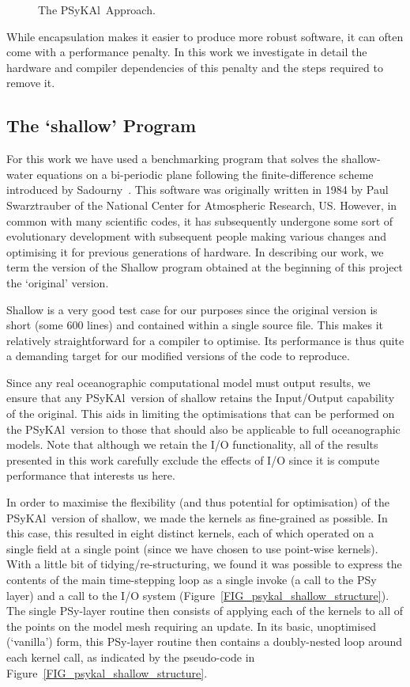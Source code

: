 \documentclass[journal]{IEEEtran}
\newcommand{\psykal}{{PS}y{KA}l\ }
\begin{document}
\begin{figure}
\centering
\caption{The \psykal Approach.}
\end{figure}

While encapsulation makes it easier to produce more robust software,
it can often come with a performance penalty. In this work we
investigate in detail the hardware and compiler dependencies of this
penalty and the steps required to remove it.

\subsection{The `shallow' Program}
For this work we have used a benchmarking program that solves the
shallow-water equations on a bi-periodic plane following the
finite-difference scheme introduced by Sadourny~\cite{sadourny75}.
This software was originally written in 1984 by Paul Swarztrauber of
the National Center for Atmospheric Research, US.  However, in common
with many scientific codes, it has subsequently undergone some sort of
evolutionary development with subsequent people making various changes
and optimising it for previous generations of hardware.  In describing
our work, we term the version of the Shallow program obtained at the
beginning of this project the `original' version.

Shallow is a very good test case for our purposes since the original
version is short (some 600 lines) and contained within a single source
file. This makes it relatively straightforward for a compiler to
optimise. Its performance is thus quite a demanding target for our
modified versions of the code to reproduce.

Since any real oceanographic computational model must output results,
we ensure that any \psykal version of shallow retains the Input/Output
capability of the original. This aids in limiting the optimisations
that can be performed on the \psykal version to those that should also
be applicable to full oceanographic models. Note that although we
retain the I/O functionality, all of the results presented in this work
carefully exclude the effects of I/O since it is compute performance
that interests us here.

In order to maximise the flexibility (and thus potential for
optimisation) of the \psykal version of shallow, we made the kernels
as fine-grained as possible. In this case, this resulted in eight
distinct kernels, each of which operated on a single field at a single
point (since we have chosen to use point-wise kernels). With a little
bit of tidying/re-structuring, we found it was possible to express the
contents of the main time-stepping loop as a single invoke (a call to
the PSy layer) and a call to the I/O system
(Figure~\ref{FIG_psykal_shallow_structure}). The single PSy-layer
routine then consists of applying each of the kernels to all of the
points on the model mesh requiring an update. In its basic,
unoptimised (`vanilla') form, this PSy-layer routine then contains a
doubly-nested loop around each kernel call, as indicated by the
pseudo-code in Figure~\ref{FIG_psykal_shallow_structure}.
\end{document}
